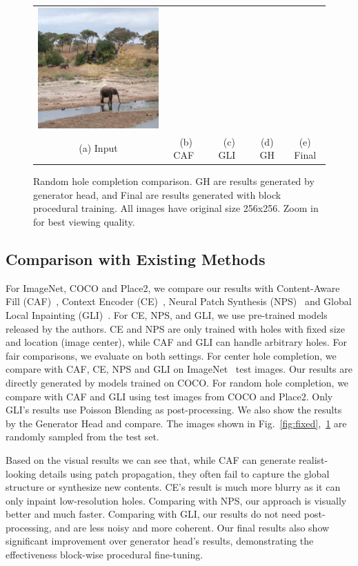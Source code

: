 \begin{figure}[h!]
\begin{tabular}{ccccc}
\includegraphics[width=.2\textwidth]{figures/random/000000286994.jpg}\\
(a) Input & (b) CAF~\cite{barnes2009patchmatch} & (c) GLI~\cite{iizuka2017globally} & (d) GH & (e) Final \\
\end{tabular}
\caption{Random hole completion comparison. GH are results generated by generator head, and Final are results generated with block procedural training. All images have original size 256x256. Zoom in for best viewing quality.}
\label{fig:random}
\vspace{-10pt}
\end{figure}

\subsection{Comparison with Existing Methods}
\label{exp:comparison}
For ImageNet, COCO and Place2, we compare our results with Content-Aware Fill (CAF)~\cite{barnes2009patchmatch}, Context Encoder (CE)~\cite{pathak2016context}, Neural Patch Synthesis (NPS)~\cite{yang2017high} and Global Local Inpainting (GLI)~\cite{iizuka2017globally}. For CE, NPS, and GLI, we use pre-trained models released by the authors. CE and NPS are only trained with holes with fixed size and location (image center), while CAF and GLI can handle arbitrary holes. For fair comparisons, we evaluate on both settings. For center hole completion, we compare with CAF, CE, NPS and GLI on ImageNet~\cite{russakovsky2015imagenet} test images. Our results are directly generated by models trained on COCO. For random hole completion, we compare with CAF and GLI using test images from COCO and Place2. Only GLI's results use Poisson Blending as post-processing. We also show the results by the Generator Head and compare. The images shown in Fig.~\ref{fig:fixed},~\ref{fig:random} are randomly sampled from the test set. 

Based on the visual results we can see that, while CAF can generate realist-looking details using patch propagation, they often fail to capture the global structure or synthesize new contents. CE's result is much more blurry as it can only inpaint low-resolution holes. Comparing with NPS, our approach is visually better and much faster. Comparing with GLI, our results do not need post-processing, and are less noisy and more coherent. Our final results also show significant improvement over generator head's results, demonstrating the effectiveness block-wise procedural fine-tuning.

